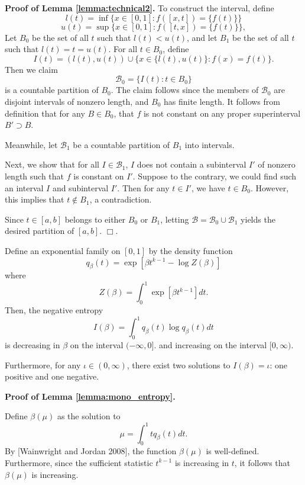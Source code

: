 \textbf{Proof of Lemma \ref{lemma:technical2}.} 
To construct the interval, define
\[
l(t) = \inf \{x \in [0,1]: f([x,t]) = \{f(t)\}\}
\]
\[
u(t) = \sup \{x \in [0,1]: f([t,x]) = \{f(t)\}\},
\]
Let $B_0$ be the set of all $t$ such that $l(t) < u(t)$,
and let $B_1$ be the set of all $t$ such that $l(t) = t = u(t)$.
For all $t \in B_0$, define
\[
I(t) = (l(t), u(t)) \cup \{x \in \{l(t), u(t)\}: f(x) = f(t)\}.
\]
Then we claim
\[
\mathcal{B}_0 = \{I(t): t \in B_0\}
\]
is a countable partition of $B_0$.  The claim follows since the
members of $\mathcal{B}_0$ are disjoint intervals of nonzero length,
and $B_0$ has finite length.    It follows from definition that for any $B \in B_0$, that $f$ is not
constant on any proper superinterval $B' \supset B$.

Meanwhile, let $\mathcal{B}_1$ be a countable partition of $B_1$ into
intervals.

Next, we show that for all $I \in \mathcal{B}_1$, $I$ does not contain
a subinterval $I'$ of nonzero length such that $f$ is constant on
$I'$.  Suppose to the contrary, we could find such an interval $I$ and
subinterval $I'$.  Then for any $t \in I'$, we have $t \in B_0$.
However, this implies that $t \notin B_1$, a contradiction.

Since $t \in [a,b]$ belongs to either $B_0$ or $B_1$,
letting $\mathcal{B} = \mathcal{B}_0 \cup \mathcal{B}_1$
yields the desired partition of $[a,b]$. $\Box$.

\begin{lemma}\label{lemma:mono_entropy}
Define an exponential family on $[0,1]$ by the density function
\[
q_\beta(t) = \exp[\beta t^{k-1} - \log Z(\beta)]
\]
where
\[
Z(\beta) = \int_0^1 \exp[\beta t^{k-1}] dt.
\]
Then, the negative entropy
\[
I(\beta) = \int_0^1 q_\beta(t) \log q_\beta(t) dt
\]
is decreasing in $\beta$ on the interval $(-\infty, 0]$.
and increasing on the interval $[0, \infty)$.

Furthermore, for any $\iota \in (0,\infty)$, there exist two solutions
to $I(\beta) = \iota$: one positive and one negative.
\end{lemma}

\textbf{Proof of Lemma \ref{lemma:mono_entropy}.}

Define $\beta(\mu)$ as the solution to
\[
\mu = \int_0^1 t q_\beta(t) dt.
\]
By [Wainwright and Jordan 2008], the function $\beta(\mu)$ is
well-defined.  Furthermore, since the sufficient statistic $t^{k-1}$
is increasing in $t$, it follows that $\beta(\mu)$ is increasing.

